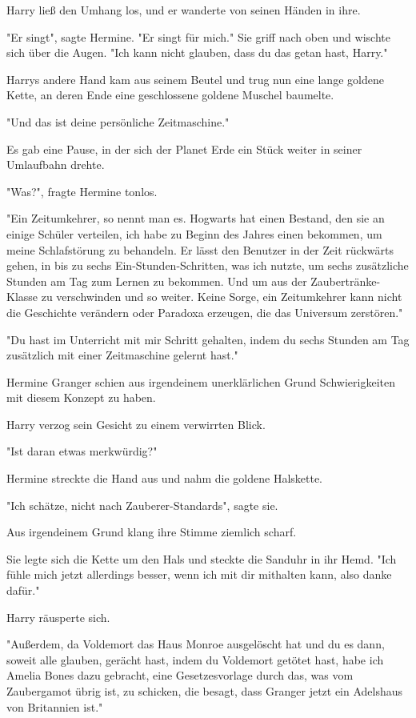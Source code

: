 {Harry ließ den Umhang los, und er wanderte von seinen Händen in ihre.

"Er singt", sagte Hermine. "Er singt für mich." Sie griff nach oben und wischte sich über die Augen. "Ich kann nicht glauben, dass du das getan hast, Harry."

Harrys andere Hand kam aus seinem Beutel und trug nun eine lange goldene Kette, an deren Ende eine geschlossene goldene Muschel baumelte.

"Und das ist deine persönliche Zeitmaschine."

Es gab eine Pause, in der sich der Planet Erde ein Stück weiter in seiner Umlaufbahn drehte.

"Was?", fragte Hermine tonlos.

"Ein Zeitumkehrer, so nennt man es. Hogwarts hat einen Bestand, den sie an einige Schüler verteilen, ich habe zu Beginn des Jahres einen bekommen, um meine Schlafstörung zu behandeln. Er lässt den Benutzer in der Zeit rückwärts gehen, in bis zu sechs Ein-Stunden-Schritten, was ich nutzte, um sechs zusätzliche Stunden am Tag zum Lernen zu bekommen. Und um aus der Zaubertränke-Klasse zu verschwinden und so weiter. Keine Sorge, ein Zeitumkehrer kann nicht die Geschichte verändern oder Paradoxa erzeugen, die das Universum zerstören."

"Du hast im Unterricht mit mir Schritt gehalten, indem du sechs Stunden am Tag zusätzlich mit einer Zeitmaschine gelernt hast."

Hermine Granger schien aus irgendeinem unerklärlichen Grund Schwierigkeiten mit diesem Konzept zu haben.

Harry verzog sein Gesicht zu einem verwirrten Blick.

"Ist daran etwas merkwürdig?"

Hermine streckte die Hand aus und nahm die goldene Halskette.

"Ich schätze, nicht nach Zauberer-Standards", sagte sie.

Aus irgendeinem Grund klang ihre Stimme ziemlich scharf.

Sie legte sich die Kette um den Hals und steckte die Sanduhr in ihr Hemd. "Ich fühle mich jetzt allerdings besser, wenn ich mit dir mithalten kann, also danke dafür."

Harry räusperte sich.

"Außerdem, da Voldemort das Haus Monroe ausgelöscht hat und du es dann, soweit alle glauben, gerächt hast, indem du Voldemort getötet hast, habe ich Amelia Bones dazu gebracht, eine Gesetzesvorlage durch das, was vom Zaubergamot übrig ist, zu schicken, die besagt, dass Granger jetzt ein Adelshaus von Britannien ist."

}

